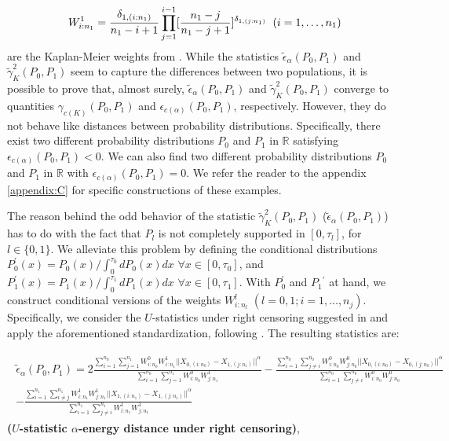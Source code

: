 \documentclass[11pt]{article}
\begin{document}
\begin{equation}
W^{1}_{{i:n_1}}= \frac{\delta_{1,(i:n_1)}}{n_1-i+1}\prod_{j=1}^{i-1}[\frac{n_1-j}{n_1-j+1}]^{\delta_{1,(j:n_1)}} \hspace{0.2cm}   (i=1,\dots,n_1)
\end{equation}are the Kaplan-Meier  weights from \cite{stute1995statistical}. While the statistics  $\tilde{\epsilon}_{\alpha}(P_0,P_1)$ and  $\tilde{\gamma}_K^{2}(P_0,P_1)$ seem to capture the differences between two populations, it is possible to prove that, almost surely, $\tilde{\epsilon}_{\alpha}(P_0,P_1)$ and  $\tilde{\gamma}_K^{2}(P_0,P_1)$  converge to quantities $\gamma_{c(K)}(P_0,P_1)$ and $\epsilon_{c(\alpha)}(P_0,P_1)$, respectively. However, they do not behave like distances between probability distributions. Specifically,  there exist two  different  probability  distributions $P_0$ and $P_1$    in $\mathbb{R} $  satisfying  $\epsilon_{c(\alpha)}(P_0, P_1)  <0$. We can also find  two  different  probability  distributions $P_0$ and $P_1$    in $\mathbb{R} $ with  $\epsilon_{c(\alpha)}(P_0, P_1)=0$. We refer the reader to the appendix \ref{appendix:C} for  specific  constructions of these examples.



The reason  behind the odd behavior of the statistic $\tilde{\gamma}_K^{2}(P_0,P_1)$  ($\tilde{\epsilon}_{\alpha}(P_0,P_1)$) has to do with the fact that   $P_l$ is not completely supported in $[0,\tau_l]$, for $l  \in \{0,1\}$. We alleviate this  problem by defining  the conditional distributions  $P^{\prime}_0 (x)= P_0(x)/ \int_{0}^{\tau_0} dP_0(x)dx$ $\forall x\in [0,\tau_0]$, and  $P^{\prime}_1 (x)= P_1 (x)/ \int_{0}^{\tau_1} dP_1 (x)dx $ $\forall x\in [0,\tau_1]$. With $P_0^{\prime}$ and $P_1{^\prime}$ at hand,  we  construct   conditional  versions of the weights $W^{l}_{i:n_l}$ $(l=0,1; i=1,\dots,n_j)$. Specifically, we consider the $U$-statistics under right censoring suggested in \cite {bose1999strong} and apply the aforementioned standardization, following \cite{stute1993multi}. The resulting statistics are: 




\begin{gather}\label{eqn:estadistico1}
\begin{align}
\tilde{\epsilon}_{\alpha}(P_0,P_1)= 2  \frac{\sum_{i=1}^{n_0}  \sum_{j=1}^{n_1} W^{0}_{i:n_0} W^{1}_{i:n_1} ||X_{0,(i:n_0)}-X_{1,(j:n_1)}||^{\alpha}}{\sum_{i=1}^{n_0}  \sum_{j=1}^{n_1} W^{0}_{i:n_0} W^{1}_{j:n_1}} - \frac{\sum_{i=1}^{n_0} \sum_{j\neq i}^{n_0}  W^{0}_{i:n_0} W^{0}_{j:n_0}  ||X_{0,(i:n_0)}-X_{0,(j:n_0)}||^{\alpha}}{\sum_{i=1}^{n_0} \sum_{j\neq i}^{n_0} W^{0}_{i:n_0} W^{0}_{j:n_0}} \\
- \frac{\sum_{i=1}^{n_1}  \sum_{i\neq j}^{n_1} W^{1}_{i:n_1} W^{1}_{j:n_1}  ||X_{1,(i:n_1)}-X_{1,(j:n_1)}||^{\alpha}}{\sum_{i=1}^{n_1}  \sum_{j\neq i}^{n_1} W^{1}_{i:n_1} W^{1}_{j:n_1}} \nonumber
\end{align}
\end{gather}
\textbf{($U$-statistic $\alpha$-energy distance under right censoring)},
\end{document}
